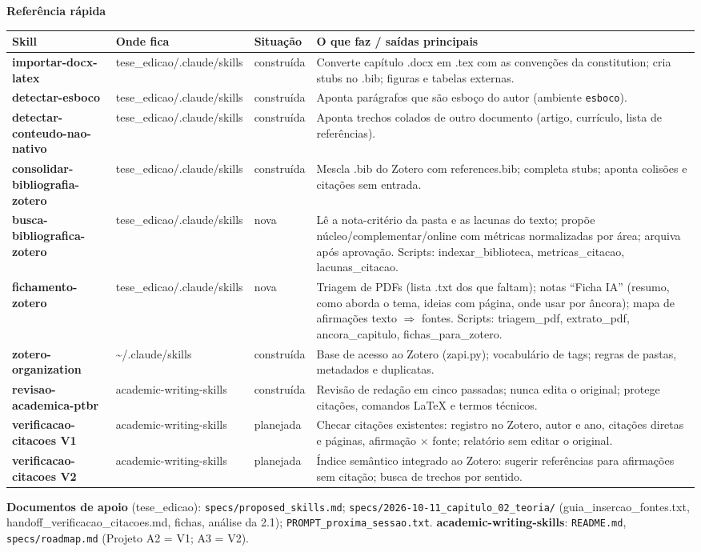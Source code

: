 \documentclass[10pt]{article}
\begin{document}
\newpage
\begin{center}{\large\bfseries Referência rápida}\end{center}
\small
\renewcommand{\arraystretch}{1.25}
\begin{tabularx}{\linewidth}{@{}>{\bfseries}p{4.6cm}p{3.3cm}p{1.9cm}X@{}}
\toprule
Skill & Onde fica & Situação & O que faz / saídas principais \\
\midrule
importar-docx-latex & tese\_edicao/.claude/skills & construída & Converte capítulo .docx em .tex com as convenções da constitution; cria stubs no .bib; figuras e tabelas externas. \\
detectar-esboco & tese\_edicao/.claude/skills & construída & Aponta parágrafos que são esboço do autor (ambiente \texttt{esboco}). \\
detectar-conteudo-nao-nativo & tese\_edicao/.claude/skills & construída & Aponta trechos colados de outro documento (artigo, currículo, lista de referências). \\
consolidar-bibliografia-zotero & tese\_edicao/.claude/skills & construída & Mescla .bib do Zotero com references.bib; completa stubs; aponta colisões e citações sem entrada. \\
busca-bibliografica-zotero & tese\_edicao/.claude/skills & nova & Lê a nota-critério da pasta e as lacunas do texto; propõe núcleo/complementar/online com métricas normalizadas por área; arquiva após aprovação. Scripts: indexar\_biblioteca, metricas\_citacao, lacunas\_citacao. \\
fichamento-zotero & tese\_edicao/.claude/skills & nova & Triagem de PDFs (lista .txt dos que faltam); notas ``Ficha IA'' (resumo, como aborda o tema, ideias com página, onde usar por âncora); mapa de afirmações texto $\Rightarrow$ fontes. Scripts: triagem\_pdf, extrato\_pdf, ancora\_capitulo, fichas\_para\_zotero. \\
zotero-organization & \textasciitilde/.claude/skills & construída & Base de acesso ao Zotero (zapi.py); vocabulário de tags; regras de pastas, metadados e duplicatas. \\
revisao-academica-ptbr & academic-writing-skills & construída & Revisão de redação em cinco passadas; nunca edita o original; protege citações, comandos LaTeX e termos técnicos. \\
verificacao-citacoes V1 & academic-writing-skills & planejada & Checar citações existentes: registro no Zotero, autor e ano, citações diretas e páginas, afirmação $\times$ fonte; relatório sem editar o original. \\
verificacao-citacoes V2 & academic-writing-skills & planejada & Índice semântico integrado ao Zotero: sugerir referências para afirmações sem citação; busca de trechos por sentido. \\
\bottomrule
\end{tabularx}

\vspace{8pt}
\textbf{Documentos de apoio} (tese\_edicao): \texttt{specs/proposed\_skills.md};
\texttt{specs/2026-10-11\_capitulo\_02\_teoria/} (guia\_insercao\_fontes.txt,
handoff\_verificacao\_citacoes.md, fichas, análise da 2.1); \texttt{PROMPT\_proxima\_sessao.txt}.
\textbf{academic-writing-skills}: \texttt{README.md}, \texttt{specs/roadmap.md} (Projeto A2 = V1; A3 = V2).
\end{document}

